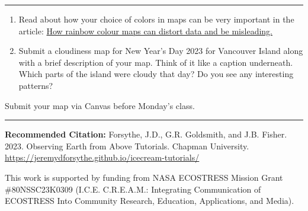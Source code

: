 \documentclass[oneside,a4paper,11pt,explicit]{book}
\begin{document}
	
	\vspace{.25em}
	
	\hrule
	
	\vspace{1 em}
	
	\begin{tcolorbox}[colback=yellow!5!white,colframe=IceCreamOrbit,title= \vspace{.2em} \Large Map of the Week Assignments]
		\large
		\begin{enumerate}
			\item Read about how your choice of colors in maps can be very important in the article: \href{https://theconversation.com/how-rainbow-colour-maps-can-distort-data-and-be-misleading-167159}{How rainbow colour maps can distort data and be misleading.}
			\item Submit a cloudiness map for New Year's Day 2023 for Vancouver Island along with a brief description of your map. Think of it like a caption underneath. Which parts of the island were cloudy that day? Do you see any interesting patterns?
		\end{enumerate}
		
		Submit your map via Canvas before Monday's class.
	\end{tcolorbox}
	
	\vfill
	
	\hrule
	
	\vspace{1em}
	
	\textbf{Recommended Citation:} Forsythe, J.D., G.R. Goldsmith, and J.B. Fisher. 2023. Observing Earth from Above Tutorials. Chapman University. \url{https://jeremydforsythe.github.io/icecream-tutorials/}
	
	\vspace{1em}
	
	This work is supported by funding from NASA ECOSTRESS Mission Grant \#80NSSC23K0309 (I.C.E. C.R.E.A.M.: Integrating Communication of ECOSTRESS Into Community Research, Education, Applications, and Media).
	
\end{document}
